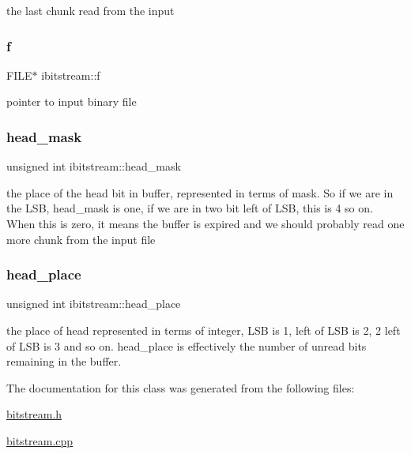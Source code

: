 the last chunk read from the input 

\mbox{\label{classibitstream_a3ea2cdd0cf97820f0e1520c42e364308}} 
\subsubsection{\texorpdfstring{f}{f}}
{\footnotesize\ttfamily F\+I\+LE$\ast$ ibitstream\+::f\hspace{0.3cm}{\ttfamily [private]}}



pointer to input binary file 

\mbox{\label{classibitstream_a48cd41991b6c29ea5120b53873a72a70}} 
\subsubsection{\texorpdfstring{head\+\_\+mask}{head\_mask}}
{\footnotesize\ttfamily unsigned int ibitstream\+::head\+\_\+mask\hspace{0.3cm}{\ttfamily [private]}}



the place of the head bit in buffer, represented in terms of mask. So if we are in the L\+SB, head\+\_\+mask is one, if we are in two bit left of L\+SB, this is 4 so on. When this is zero, it means the buffer is expired and we should probably read one more chunk from the input file 

\mbox{\label{classibitstream_a7b96359ac1534a5565e6e9b0cc53a0b3}} 
\subsubsection{\texorpdfstring{head\+\_\+place}{head\_place}}
{\footnotesize\ttfamily unsigned int ibitstream\+::head\+\_\+place\hspace{0.3cm}{\ttfamily [private]}}



the place of head represented in terms of integer, L\+SB is 1, left of L\+SB is 2, 2 left of L\+SB is 3 and so on. head\+\_\+place is effectively the number of unread bits remaining in the buffer. 



The documentation for this class was generated from the following files\+:\begin{DoxyCompactItemize}
\item 
\hyperlink{bitstream_8h}{bitstream.\+h}\item 
\hyperlink{bitstream_8cpp}{bitstream.\+cpp}\end{DoxyCompactItemize}

